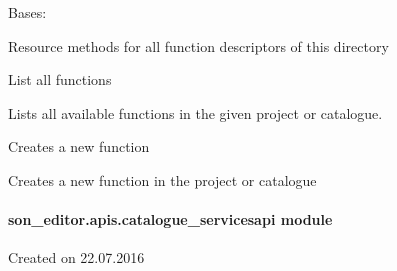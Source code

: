 \documentclass[letterpaper,10pt,english]{sphinxmanual}
\begin{document}

\begin{fulllineitems}
\label{_source/son_editor.apis:son_editor.apis.catalogue_functionsapi.Functions}
Bases: 

Resource methods for all function descriptors of this directory

\begin{fulllineitems}
\label{_source/son_editor.apis:son_editor.apis.catalogue_functionsapi.Functions.get}
List all functions

Lists all available functions in the given project or catalogue.

\end{fulllineitems}


\begin{fulllineitems}
\label{_source/son_editor.apis:son_editor.apis.catalogue_functionsapi.Functions.methods}
\end{fulllineitems}


\begin{fulllineitems}
\label{_source/son_editor.apis:son_editor.apis.catalogue_functionsapi.Functions.post}
Creates a new function

Creates a new function in the project or catalogue

\end{fulllineitems}


\end{fulllineitems}



\paragraph{son\_editor.apis.catalogue\_servicesapi module}
\label{_source/son_editor.apis:son-editor-apis-catalogue-servicesapi-module}\label{_source/son_editor.apis:module-son_editor.apis.catalogue_servicesapi}
Created on 22.07.2016
\end{document}
